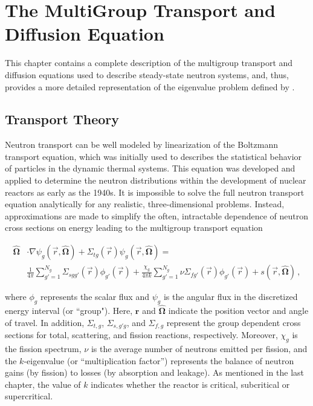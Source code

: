 \cleardoublepage

\chapter{The MultiGroup Transport and Diffusion Equation}
\label{chapter:multigroup}

This chapter contains a complete description of the multigroup transport and diffusion equations used to describe steady-state neutron systems, and, thus, provides a more detailed representation of the eigenvalue problem defined by . 

\section{Transport Theory}

Neutron transport can be well modeled by linearization of the Boltzmann transport equation, which was initially used to describes the statistical behavior of particles in the dynamic thermal systems.
This equation was developed and applied to determine the neutron distributions within the development of nuclear reactors as early as the 1940s.
It is impossible to solve the full neutron transport equation analytically for any realistic, three-dimensional problems.
Instead, approximations are made to simplify the often, intractable dependence of neutron cross sections on energy leading to the multigroup transport equation 

\begin{equation}
\begin{split}
  \bm{\hat{\Omega}} & \cdot \nabla \psi_g(\vec{r},\bm{\hat{\Omega}}) +
    \Sigma_{t g}(\vec{r}) \psi_{g}(\vec{r},\bm{\hat{\Omega}}) = \\
   & \frac{1}{4\pi} \sum\limits^{N_g}_{g'=1} \Sigma_{s g g'}(\vec{r}) \phi_{g'}(\vec{r}) +
    \frac{\chi_g}{4\pi k} \sum\limits^{N_g}_{g'=1} \nu\Sigma_{fg'}(\vec{r}) \phi_{g'}(\vec{r}) 
    + s(\vec{r},\bm{\hat{\Omega}})\, ,
\end{split}
\label{eq:transport}
\end{equation}

where $\phi_g$ represents the scalar flux and $\psi_g$ is the angular flux in the discretized energy interval (or ``group").  
Here, $\mathbf{r}$ and $\bm{\hat{\Omega}}$ indicate the position vector and angle of travel.
In addition, $\Sigma_{t,g}$, $\Sigma_{s,g\prime g}$, and $\Sigma_{f,g}$ represent the group dependent cross sections for total, scattering, and fission reactions, respectively.
Moreover, $\chi_g$ is the fission spectrum, $\nu$ is the average number of neutrons emitted per fission, and the $k$-eigenvalue (or ``multiplication factor'') represents the balance of neutron gains (by fission) to losses (by absorption and leakage).  
As mentioned in the last chapter, the value of $k$ indicates whether the reactor is critical, subcritical or supercritical.

